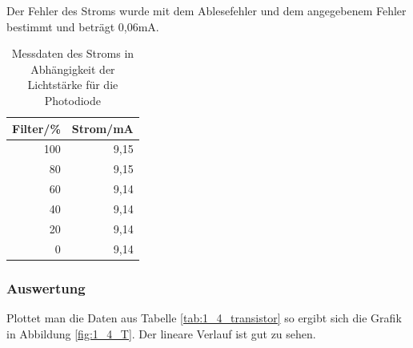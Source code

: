 \documentclass[12pt,a4paper]{article}
\begin{document}
Der Fehler des Stroms wurde mit dem Ablesefehler und dem angegebenem Fehler bestimmt und beträgt 0,06mA.

\begin{table}[H]
\begin{center}
\begin{tabular}{|r|r|}
\hline
\multicolumn{1}{|l|}{Filter/\%} & \multicolumn{1}{l|}{Strom/mA} \\ \hline
100 & 9,15 \\ \hline
80 & 9,15 \\ \hline
60 & 9,14 \\ \hline
40 & 9,14 \\ \hline
20 & 9,14 \\ \hline
0 & 9,14 \\ \hline
\end{tabular}
\end{center}
\caption{Messdaten des Stroms in Abhängigkeit der Lichtstärke für die Photodiode}
\label{tab:1_4_diode}
\end{table}


\subsubsection*{Auswertung}

Plottet man die Daten aus Tabelle \ref{tab:1_4_transistor} so ergibt sich die Grafik in Abbildung \ref{fig:1_4_T}. Der lineare Verlauf ist gut zu sehen.
\end{document}
